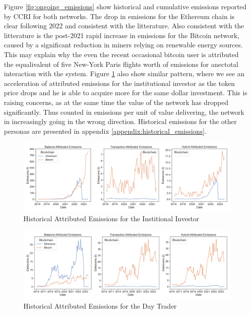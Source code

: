 \documentclass[11pt]{report}
\begin{document}
Figure \ref{fig:ongoing_emissions} show historical and cumulative emissions reported by CCRI for both networks. The drop in emissions for the Ethereum chain is clear following 2022 and consistent with the litterature. Also consistent with the litterature is the post-2021 rapid increase in emissions for the Bitcoin network, caused by a significant reduction in miners relying on renewable energy sources. This may explain why the even the recent occasional bitcoin user is attributed the equalivalent of five New-York Paris flights worth of emissions for anectotal interaction with the system. Figure \ref{fig:attributed_investor} also show similar pattern, where we see an acceleration of attributed emissions for the institutional investor as the token price drops and he is able to acquire more for the same dollar investment. This is raising concerns, as at the same time the value of the network has dropped significantly. Thus counted in emissions per unit of value delivering, the network in increasingly going in the wrong direction. Historical emissions for the other personas are presented in appendix \ref{appendix:historical_emissions}.


\begin{figure}[h!]
    \centering
    \centerline{\includegraphics[scale=0.4]{figures/attributed_em_invest.png}}
    \caption{Historical Attributed Emissions for the Institional Investor}
    \label{fig:attributed_investor}
\end{figure}


\begin{figure}[h!]
    \centering
    \centerline{\includegraphics[scale=0.4]{figures/attributed_em_trader.png}}
    \caption{Historical Attributed Emissions for the Day Trader}
    \label{fig:attributed_trader}
\end{figure}
\end{document}
